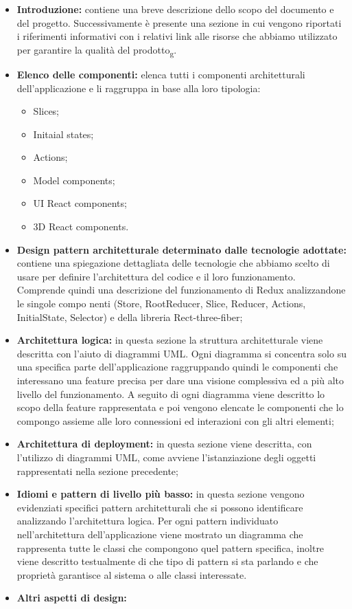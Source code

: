 \begin{itemize}
\item \textbf{Introduzione:} contiene una breve descrizione dello scopo del documento e del progetto.
Successivamente è presente una sezione in cui vengono riportati i riferimenti informativi 
con i relativi link alle risorse che abbiamo utilizzato per garantire la qualità del prodotto\textsubscript{g}.

\item \textbf{Elenco delle componenti:} elenca tutti i componenti architetturali dell'applicazione e li raggruppa in base alla loro tipologia:
\begin{itemize}
 	\item Slices;
 	\item  Initaial states;
 	\item Actions; 
 	\item Model components; 
 	\item UI React components; 
 	\item 3D React components.
\end{itemize}

\item \textbf{Design pattern architetturale determinato dalle tecnologie adottate:} contiene una spiegazione dettagliata delle tecnologie che abbiamo scelto di usare per definire l'architettura del codice e il loro funzionamento.
Comprende quindi una descrizione del funzionamento di Redux analizzandone le singole compo	nenti (Store, RootReducer, Slice, Reducer, Actions, InitialState, Selector) e della libreria Rect-three-fiber;

\item \textbf{ Architettura logica:} in questa sezione la struttura architetturale viene descritta con l'aiuto di diagrammi UML. Ogni diagramma si concentra solo su una specifica parte dell'applicazione raggruppando quindi le componenti che interessano una feature precisa per dare una visione complessiva ed a più alto livello del funzionamento.
A seguito di ogni diagramma viene descritto lo scopo della feature rappresentata e poi vengono elencate le componenti che lo compongo assieme alle loro connessioni ed interazioni con gli altri elementi;

\item \textbf{Architettura di deployment:} in questa sezione viene descritta, con l'utilizzo di diagrammi UML, come avviene l'istanziazione degli oggetti rappresentati nella sezione precedente;

\item \textbf{Idiomi e pattern di livello più basso:} in questa sezione vengono evidenziati specifici pattern architetturali che si possono identificare analizzando l'architettura logica. Per ogni pattern individuato nell'architettura dell'applicazione viene mostrato un diagramma che rappresenta tutte le classi che compongono quel pattern specifica, inoltre viene descritto testualmente di che tipo di pattern si sta parlando e che proprietà garantisce al sistema o alle classi interessate.

\item \textbf{Altri aspetti di design:}

\end{itemize}